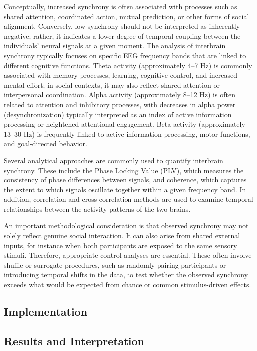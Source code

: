 \documentclass{article}
\theoremstyle{plain}
\theoremstyle{definition}
\theoremstyle{remark}
\begin{document}
Conceptually, increased synchrony is often associated with processes such as shared attention, coordinated action, mutual prediction, or other forms of social alignment. Conversely, low synchrony should not be interpreted as inherently negative; rather, it indicates a lower degree of temporal coupling between the individuals’ neural signals at a given moment. The analysis of interbrain synchrony typically focuses on specific EEG frequency bands that are linked to different cognitive functions. Theta activity (approximately 4–7 Hz) is commonly associated with memory processes, learning, cognitive control, and increased mental effort; in social contexts, it may also reflect shared attention or interpersonal coordination. Alpha activity (approximately 8–12 Hz) is often related to attention and inhibitory processes, with decreases in alpha power (desynchronization) typically interpreted as an index of active information processing or heightened attentional engagement. Beta activity (approximately 13–30 Hz) is frequently linked to active information processing, motor functions, and goal-directed behavior.

Several analytical approaches are commonly used to quantify interbrain synchrony. These include the Phase Locking Value (PLV), which measures the consistency of phase differences between signals, and coherence, which captures the extent to which signals oscillate together within a given frequency band. In addition, correlation and cross-correlation methods are used to examine temporal relationships between the activity patterns of the two brains.

An important methodological consideration is that observed synchrony may not solely reflect genuine social interaction. It can also arise from shared external inputs, for instance when both participants are exposed to the same sensory stimuli. Therefore, appropriate control analyses are essential. These often involve shuffle or surrogate procedures, such as randomly pairing participants or introducing temporal shifts in the data, to test whether the observed synchrony exceeds what would be expected from chance or common stimulus-driven effects.

\subsection{Implementation}

\subsection{Results and Interpretation}
\end{document}
